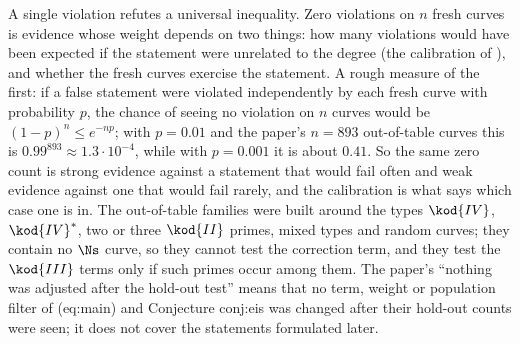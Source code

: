 \begin{sloppypar}
\begin{remark}\label{rem:computation:what-is-tested}
A single violation refutes a universal inequality. Zero violations on $n$ fresh curves is evidence whose weight depends on two things: how many
violations would have been expected if the statement were unrelated to the degree (the calibration of ), and
whether the fresh curves exercise the statement. A rough measure of the first: if a false statement were violated independently by each fresh
curve with probability $p$, the chance of seeing no violation on $n$ curves would be $(1-p)^n\le e^{-np}$; with $p=0.01$ and the paper's $n=893$
out-of-table curves this is $0.99^{893}\approx1.3\cdot10^{-4}$, while with $p=0.001$ it is about $0.41$. So the same zero count is strong evidence
against a statement that would fail often and weak evidence against one that would fail rarely, and the calibration is what says which case one
is in. The out-of-table families were built around the types $\kod{IV}$, $\kod{IV}^*$, two or three $\kod{II}$ primes,
mixed types and random curves; they contain no $\Ns$ curve, so they cannot test the correction term, and they test the $\kod{III}$ terms only if such
primes occur among them. The paper's ``nothing was adjusted after the hold-out test'' means that no term, weight or population filter of (eq:main) and
Conjecture conj:eis was changed after their hold-out counts were seen; it does not cover the statements formulated later.
\end{remark}


\end{sloppypar}
